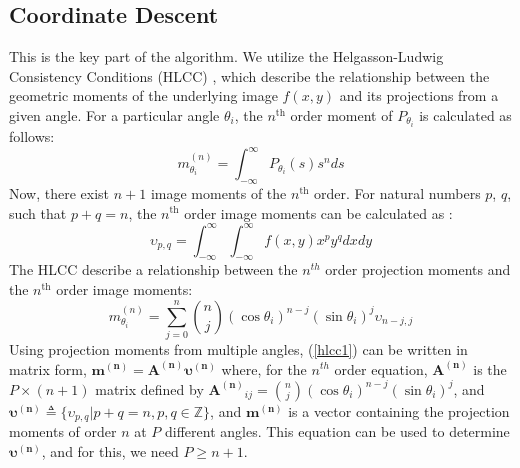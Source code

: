 \documentclass{article}
\begin{document}
\subsection{Coordinate Descent}
\label{ssec:descent}
This is the key part of the algorithm. We utilize the Helgasson-Ludwig Consistency Conditions (HLCC) \cite{Natterer1986}, which describe the relationship between the geometric moments of the underlying image $f(x,y)$ and its projections from a given angle. For a particular angle $\theta_i$, the $n^{\textrm{th}}$ order moment of $P_{\theta_i}$ is calculated as follows:
\begin{equation}\label{PM}
m^{(n)}_{\theta_i} = \int_{-\infty}^{\infty} P_{\theta_i}(s) s^n ds
\end{equation}
Now, there exist $n+1$ image moments of the $n^{\textrm{th}}$ order. For natural numbers $p$, $q$, such that $p + q = n$, the $n^{\textrm{th}}$ order image moments can be calculated as \cite{dipbook}:
\begin{equation}
\upsilon_{p,q} = \int_{-\infty}^{\infty} \int_{-\infty}^{\infty} f(x,y) x^py^q dx dy
\end{equation}
The HLCC describe a relationship between the $n^{th}$ order projection moments and the $n^{\textrm{th}}$ order image moments: 
\begin{equation}\label{hlcc1}
m^{(n)}_{\theta_i} = \sum\limits_{j=0}^n  {n \choose j} (\cos{\theta_i})^{n-j}(\sin{\theta_i})^j \upsilon_{n-j,j}
\end{equation}
Using projection moments from multiple angles, (\ref{hlcc1}) can be written in matrix form, $\mathbf{m^{(n)}} = \mathbf{A^{(n)}} \boldsymbol{\upsilon^{(n)}}$
where, for the $n^{th}$ order equation, $\mathbf{A^{(n)}}$ is the $P \times (n+1)$ matrix defined by $\mathbf{A^{(n)}}_{ij} = {n \choose j} (\cos{\theta_i})^{n-j}(\sin{\theta_i})^j$, and $\boldsymbol{\upsilon^{(n)}} \triangleq \{\upsilon_{p,q} | p + q = n, p, q \in \mathbb{Z} \}$, and $\mathbf{m^{(n)}}$ is a vector containing the projection moments of order $n$ at $P$ different angles. This equation can be used to determine $\boldsymbol{\upsilon^{(n)}}$, and for this, we need $P \geq n+1$.
\end{document}
